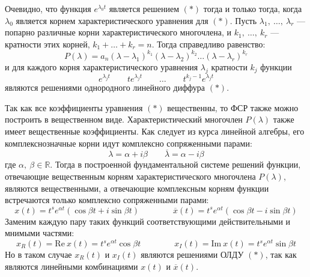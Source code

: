 \documentclass[a4paper,12pt]{article}
\renewcommand{\Re}{\mathrm{Re\:}}
\renewcommand{\Im}{\mathrm{Im\:}}
\newcommand{\R}{\mathbb{R}}
\begin{document}
Очевидно, что функция $e^{\lambda_0t}$ является решением $(*)$ тогда и только тогда, когда $\lambda_0$ является корнем характеристического уравнения для $(*)$.
Пусть $\lambda_1,\ \ldots,\ \lambda_r$ --- попарно различные корни характеристического многочлена, и $k_1,\ \ldots,\ k_r$ --- кратности этих корней, $k_1 + \ldots + k_r = n$.
Тогда справедливо равенство:
\[P(\lambda) = a_n(\lambda - \lambda_1)^{k_1}(\lambda - \lambda_2)^{k_2}\ldots(\lambda - \lambda_r)^{k_r}\]
и для каждого корня характеристического уравнения $\lambda_j$ кратности $k_j$ функции
\[e^{\lambda_jt}\qquad te^{\lambda_jt} \qquad \ldots \qquad t^{k_j - 1}e^{\lambda_jt}\]
являются решениями однородного линейного диффура $(*)$.

Так как все коэффициенты уравнения $(*)$ вещественны, то ФСР также можно построить в вещественном виде.
Характеристический многочлен $P(\lambda)$ также имеет вещественные коэффициенты.
Как следует из курса линейной алгебры, его комплекснозначные корни идут комплексно сопряженными парами: 
\[\lambda = \alpha + i\beta\qquad \overline{\lambda} = \alpha - i\beta\]
где $\alpha,\ \beta \in \R$.
Тогда в построенной фундаментальной системе решений функции, отвечающие вещественным корням
характеристического многочлена $P(\lambda)$, являются вещественными, а отвечающие комплексным корням функции встречаются только комплексно сопряженными парами:
\[x(t) = t^se^{\alpha t}(\cos \beta t + i\sin \beta t)\qquad \qquad \overline{x}(t) = t^se^{\alpha t}(\cos \beta t - i \sin \beta t)\]
Заменим каждую пару таких функций соответствующими действительными и мнимыми частями:
\[x_R(t) = \Re x(t) = t^s e^{\alpha t}\cos \beta t\qquad\qquad x_I(t) = \Im x(t) = t^se^{\alpha t}\sin \beta t\]
Но в таком случае $x_R(t)$ и $x_I(t)$ являются решениями ОЛДУ $(*)$, так как являются линейными комбинациями $x(t)$ и $\overline{x}(t)$.
\end{document}
